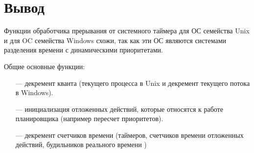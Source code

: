 \chapter*{Вывод}
Функции обработчика прерывания от системного таймера для ОС семейства Unix и для OC семейства Windows схожи, так как эти ОС являются системами разделения времени с динамическими приоритетами. 

Общие основные функции:
\begin{itemize}
	\item[---] декремент кванта (текущего процесса в Unix и декремент текущего потока в Windows).
	\item[---] инициализация отложенных действий, которые относятся к работе планировщика (например пересчет приоритетов).
	\item[---] декремент счетчиков времени (таймеров, счетчиков времени отложенных действий, будильников реального времени ) 
\end{itemize}


